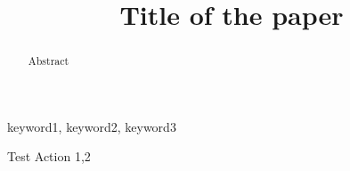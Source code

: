 \documentclass[conference]{IEEEtran}
\begin{document}
\title{Title of the paper
{\footnotesize}
}

\author{
}

\maketitle

\begin{abstract} 
Abstract 
\end{abstract}

\begin{IEEEkeywords}
keyword1, keyword2, keyword3
\end{IEEEkeywords}


Test Action 1,2


\clearpage
\end{document}

